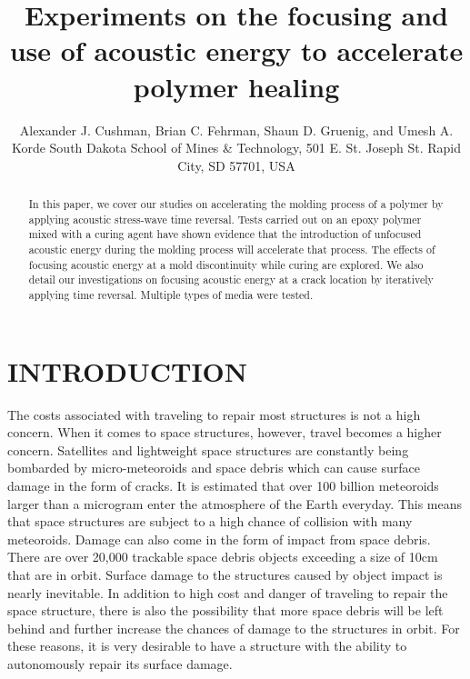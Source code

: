 \documentclass[a4paper]{spie}  %
\title{Experiments on the focusing and use of acoustic energy to accelerate polymer healing}
\author{Alexander J. Cushman\supit{a}, Brian C. Fehrman\supit{a}, Shaun D. Gruenig\supit{a}, and Umesh A. Korde\supit{a}
\skiplinehalf
\supit{a}South Dakota School of Mines \& Technology, 501 E. St. Joseph St. Rapid City, SD 57701, USA \\
}
\begin{document}
 
  \maketitle 

\begin{abstract}
In this paper, we cover our studies on accelerating the molding process of a polymer by applying acoustic stress-wave time reversal. Tests carried out on an epoxy polymer mixed with a curing agent have shown evidence that the introduction of unfocused acoustic energy during the molding process will accelerate that process. The effects of focusing acoustic energy at a mold discontinuity while curing are explored. We also detail our investigations on focusing acoustic energy at a crack location by iteratively applying time reversal. Multiple types of media were tested.
\end{abstract}



\section{INTRODUCTION}
\label{sec:intro}  %
The costs associated with traveling to repair most structures is not a high concern. When it comes to space structures, however, travel becomes a higher concern. Satellites and lightweight space structures are constantly being bombarded by micro-meteoroids and space debris which can cause surface damage in the form of cracks. It is estimated that over 100 billion meteoroids larger than a microgram enter the atmosphere of the Earth everyday. This means that space structures are subject to a high chance of collision with many meteoroids. Damage can also come in the form of impact from space debris. There are over 20,000 trackable space debris objects exceeding a size of 10cm that are in orbit. Surface damage to the structures caused by object impact is nearly inevitable. In addition to high cost and danger of traveling to repair the space structure, there is also the possibility that more space debris will be left behind and further increase the chances of damage to the structures in orbit. For these reasons, it is very desirable to have a structure with the ability to autonomously repair its surface damage. \cite{Close2010, Lee2009}
\end{document}
